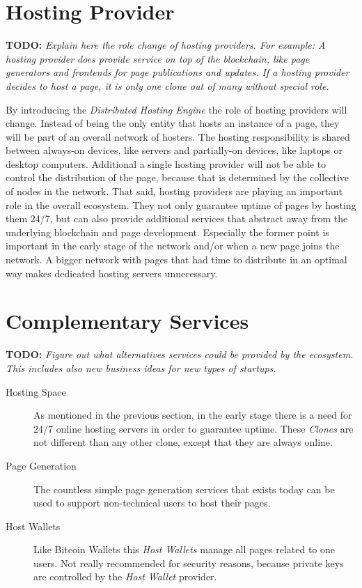 
\section{Hosting Provider}

\textbf{TODO:} \textit{Explain here the role change of hosting providers. For
example: A hosting provider does provide service on top of the blockchain,
like page generators and frontends for page publications and updates. If a
hosting provider decides to host a page, it is only one clone out of many
without special role.}
\newline

By introducing the \textit{Distributed Hosting Engine} the role of hosting
providers will change. Instead of being the only entity that hosts an instance
of a page, they will be part of an overall network of hosters. The hosting
responsibility is shared between always-on devices, like servers and
partially-on devices, like laptops or desktop computers. Additional a single
hosting provider will not be able to control the distribution of the page,
because that is determined by the collective of nodes in the network. That
said, hosting providers are playing an important role in the overall
ecosystem. They not only guarantee uptime of pages by hosting them 24/7, but
can also provide additional services that abstract away from the underlying
blockchain and page development. Especially the former point is important in
the early stage of the network and/or when a new page joins the network. A
bigger network with pages that had time to distribute in an optimal way makes
dedicated hosting servers unnecessary.

\section{Complementary Services}

\textbf{TODO:} \textit{Figure out what alternatives services could be provided
by the ecosystem. This includes also new business ideas for new types of
startups.}
\newline

\begin{description}
\item[Hosting Space] As mentioned in the previous section, in the early stage
there is a need for 24/7 online hosting servers in order to guarantee uptime.
These \textit{Clones} are not different than any other clone, except that they
are always online.
\item[Page Generation] The countless simple page generation services that
exists today can be used to support non-technical users to host their pages.
\item[Host Wallets] Like Bitcoin Wallets this \textit{Host Wallets} manage all
pages related to one users. Not really recommended for security reasons,
because private keys are controlled by the \textit{Host Wallet} provider.
\end{description}
